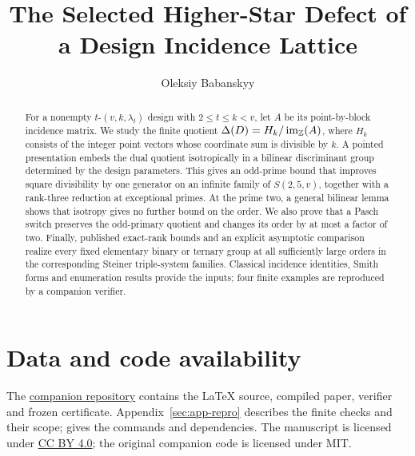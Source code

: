 \documentclass[11pt,a4paper]{article}
\title{The Selected Higher-Star Defect of a Design Incidence Lattice}
\author{Oleksiy Babanskyy}
\date{}
\begin{document}
\maketitle

\begin{abstract}
For a nonempty $t$-$(v,k,\lambda_t)$ design with $2\le t\le k<v$, let $A$ be
its point-by-block incidence matrix. We study the finite quotient
$\Delta(D)=H_k/\operatorname{im}_{\mathbb{Z}}(A)$, where $H_k$ consists of the integer point vectors
whose coordinate sum is divisible by $k$. A pointed presentation embeds the
dual quotient isotropically in a bilinear discriminant group determined by
the design parameters. This gives an odd-prime bound that improves square
divisibility by one generator on an infinite family of $S(2,5,v)$, together
with a rank-three reduction at exceptional primes. At the prime two, a
general bilinear lemma shows that isotropy gives no further bound on the
order. We also prove that a Pasch switch preserves the odd-primary quotient
and changes its order by at most a factor of two. Finally, published
exact-rank bounds and an explicit asymptotic comparison realize every fixed
elementary binary or ternary group at all sufficiently large orders in the
corresponding Steiner triple-system families. Classical incidence identities,
Smith forms and enumeration results provide the inputs; four finite examples
are reproduced by a companion verifier.
\end{abstract}









\appendix





\section*{Data and code availability}
The \href{https://github.com/aconsciousfractal/FCIG-Higher-Star-Defect-Design-Lattice}{companion repository}
contains the \LaTeX{} source, compiled paper, verifier and frozen certificate.
Appendix~\ref{sec:app-repro} describes the finite checks and their scope;
 gives the commands and dependencies. The manuscript is
licensed under \href{https://creativecommons.org/licenses/by/4.0/}{CC BY 4.0};
the original companion code is licensed under MIT.
\end{document}
